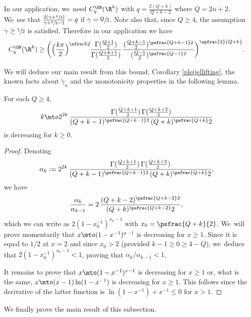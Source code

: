 In our application, we~need $C^\GN_q(\R^k)$ with $q=\frac{2(Q+k)}{Q+k-2}$ where $Q=2n+2$. We~see that $\frac{2(\gamma+\sfrac k2)}{\gamma+\sfrac k2 -1} = q$ if $\gamma=\sfrac Q2$. Note also that, since $Q\geq 4$, the assumption $\gamma\geq\sfrac12$ is satisfied. Therefore in our application we have
\begin{equation}
\label{eq:cgnlower}
C_q^\GN(\R^k) \geq \biggl(\Bigl(\frac{k\pi}{2}\Bigr)^{\sfrac k2} \frac{\Gamma(\frac{Q+1}2)}{\Gamma(\frac{Q+k+1}2)} \,\frac{(\frac{Q+k-1}{2})^{\psfrac{Q+k-1}2}}{(\frac{Q-1}2)^{\psfrac{Q-1}2}}\biggr)^{\spfrac{2}{Q+k}}.
\end{equation}

We will deduce our main result from this bound, Corollary \ref{pleijellifting}, the known facts about $\tilde\gamma_n$ and the monotonicity properties in the following lemma.

\begin{lemma}\label{mono}
For each $Q\geq 4$,
\[
k \mto 2^{2k} \,\frac{\Gamma(\frac{Q+k+1}2)\,\Gamma(\frac{Q+k+2}2)}{(Q+k-1)^{\psfrac{Q+k-1}2} \,(Q+k)^\psfrac{Q+k}2}
\]
is decreasing for $k\geq 0$.
\end{lemma}

\begin{proof}
Denoting
\[
\alpha_k := 2^{2k} \,\frac{\Gamma(\frac{Q+k+1}2)\,\Gamma(\frac{Q+k+2}2)}{(Q+k-1)^{\psfrac{Q+k-1}2} \,(Q+k)^\psfrac{Q+k}2},
\]
we have
\[
\frac{\alpha_k}{\alpha_{k-1}} = 2 \,\frac{(Q+k-2)^{\psfrac{Q+k-2}2}}{(Q+k)^\psfrac{Q+k-2}2},
\]
which we can write as $2(1- x_0^{-1})^{x_0-1}$ with $x_0=\psfrac{Q+k}{2}$. We~will prove momentarily that $x\mto(1-x^{-1})^{x-1}$ is decreasing for $x\geq 1$. Since it is equal to $1/2$ at $x=2$ and since $x_0> 2$ (provided $k-1\geq 0\geq 4-Q$), we~deduce that $2(1- x_0^{-1})^{x_0-1}< 1$, proving that $\alpha_k/\alpha_{k-1}< 1$.

It remains to prove that $x\mto(1-x^{-1})^{x-1}$ is decreasing for $x\geq 1$ or, what is the same, $x\mto (x-1)\ln(1-x^{-1})$ is decreasing for $x\geq 1$. This follows since the derivative of the latter function is $\ln(1-x^{-1}) + x^{-1}\leq 0$ for $x>1$.
\end{proof}

We finally prove the main result of this subsection.

